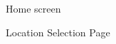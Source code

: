 \documentclass[5pt]{article} %
\begin{document}
\begin{figure}[h!]
\centering
{}
\caption{Home screen}
\end{figure}

\begin{figure}[h!]
\centering
{}
\caption{Location Selection Page}
\end{figure}
\end{document}
